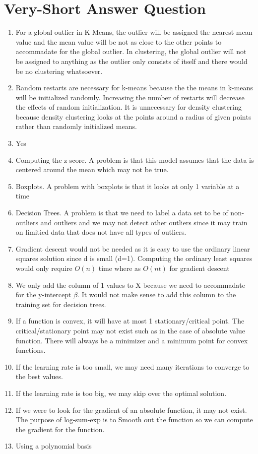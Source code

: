 \documentclass{article}
\begin{document}
\section{Very-Short Answer Question}
\begin{enumerate}
    \item For a global outlier in K-Means, the outlier will be assigned the nearest mean value and the mean value 
    will be not as close to the other points to accommadate for the global outlier. In clustering, the global outlier 
    will not be assigned to anything as the outlier only consists of itself and there would be no clustering whatsoever.
    \item Random restarts are necessary for k-means because the the means in k-means will be initialized randomly. Increasing
    the number of restarts will decrease the effects of random initialization. It is unnecessary for density clustering
    because density clustering looks at the points around a radius of given points rather than randomly initialized means.
    \item Yes
    \item Computing the z score. A problem is that this model assumes that the data is centered around the mean which may not be true.
    \item Boxplots. A problem with boxplots is that it looks at only 1 variable at a time
    \item Decision Trees. A problem is that we need to label a data set to be of non-outliers and outliers and we may not detect
    other outliers since it may train on limitied data that does not have all types of outliers.
    \item Gradient descent would not be needed as it is easy to use the ordinary linear squares solution since d is small (d=1). Computing
    the ordinary least squares would only require $O(n)$ time where as $O(nt)$ for gradient descent
    \item We only add the column of 1 values to X because we need to accommadate for the y-intercept $\beta$. It would not make
    sense to add this column to the training set for decision trees. 
    \item If a function is convex, it will have at most 1 stationary/critical point. The critical/stationary point may not exist
    such as in the case of absolute value function. There will always be a minimizer and a minimum point for convex functions.
    \item If the learning rate is too small, we may need many iterations to converge to the best values.
    \item If the learning rate is too big, we may skip over the optimal solution.
    \item If we were to look for the gradient of an absolute function, it may not exist. The purpose of log-sum-exp is to Smooth
    out the function so we can compute the gradient for the function.
    \item Using a polynomial basis
\end{enumerate}
\end{document}
